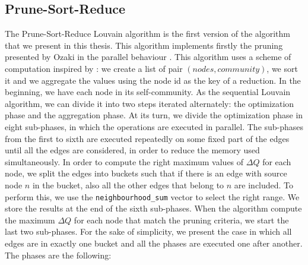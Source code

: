 \subsection{Prune-Sort-Reduce}\label{Prune-Sort-Reduce}
The Prune-Sort-Reduce Louvain algorithm is the first version of the algorithm that we present in this thesis. This algorithm implements firstly the pruning presented by Ozaki in the parallel behaviour \cite{pruning}. This algorithm uses a scheme of computation inspired by \cite{cheong2013hierarchical}: we create a list of pair $(nodes, community)$, we sort it and we aggregate the values using the node id as the key of a reduction. In the beginning, we have each node in its self-community. As the sequential Louvain algorithm, we can divide it into two steps iterated alternately: the optimization phase and the aggregation phase. 
At its turn, we divide the optimization phase in eight sub-phases, in which the operations are executed in parallel. The sub-phases from the first to sixth are executed repeatedly on some fixed part of the edges until all the edges are considered, in order to reduce the memory used simultaneously. In order to compute the right maximum values of $\Delta Q$ for each node, we split the edges into buckets such that if there is an edge with source node $n$ in the bucket, also all the other edges that belong to $n$ are included. To perform this, we use the \verb|neighbourhood_sum| vector to select the right range. We store the results at the end of the sixth sub-phases. When the algorithm compute the maximum $\Delta Q$ for each node that match the pruning criteria, we start the last two sub-phases. For the sake of simplicity, we present the case in which all edges are in exactly one bucket and all the phases are executed one after another. The phases are the following:
